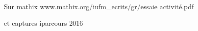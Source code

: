 \begin{activite}
    Sur mathix www.mathix.org/iufm\_ecrits/gr/essaie activité.pdf

    et captures iparcours 2016
\end{activite}